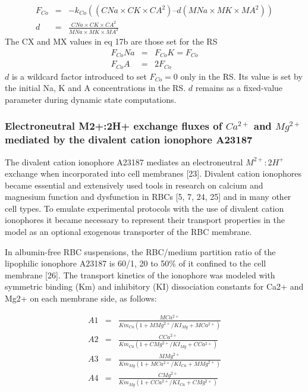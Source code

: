 \documentclass[a4paper]{article}
\newcommand{\med}[1]{M#1}
\newcommand{\cell}[1]{C#1}
\newcommand{\MA}{\med{A}}
\newcommand{\MNa}{\med{Na}}
\newcommand{\MK}{\med{K}}
\newcommand{\MCatp}{\med{Ca^{2+}}}
\newcommand{\MMgtp}{\med{Mg^{2+}}}
\newcommand{\Km}[1]{Km_{#1}}
\newcommand{\KI}[1]{KI_{#1}}
\newcommand{\CNa}{\cell{Na}}
\newcommand{\CK}{\cell{K}}
\newcommand{\CMgtp}{\cell{Mg^{2+}}}
\newcommand{\CCatp}{\cell{Ca^{2+}}}
\newcommand{\CA}{\cell{A}}
\newcommand{\F}[2]{F_{#1}#2}
\newcommand{\kk}[2]{k_{#1}#2}
\begin{document}
\begin{eqnarray}
\F{Co}{} &=& -\kk{Co}{}((CNa\times\CK\times\CA^2) – d(MNa\times\MK\times\MA^2)) \\
d &=& \frac{\CNa\times\CK\times\CA^2}{\MNa\times\MK\times\MA^2}
\end{eqnarray}
The CX and MX values in eq 17b are those set for the RS 
\begin{eqnarray}
\F{Co}{Na} &=& \F{Co}{K} = \F{Co}{}\\
\F{Co}{A} &=& 2\F{Co}{}
\end{eqnarray}
$d$ is a wildcard factor introduced to set $\F{Co}{} = 0$ only in the RS. Its value is set by the initial Na, K and A concentrations in the RS. $d$ remains as a fixed-value parameter during dynamic state computations.    

\subsubsection{Electroneutral M2+:2H+ exchange fluxes of $Ca^{2+}$ and $Mg^{2+}$ mediated by the divalent cation ionophore A23187}

The divalent cation ionophore A23187 mediates an electroneutral $M^{2+}:2H^+$ exchange when incorporated into cell membranes [23]. Divalent cation ionophores became essential and extensively used tools in research on calcium and magnesium function and dysfunction in RBCs [5, 7, 24, 25] and in many other cell types. To emulate experimental protocols with the use of divalent cation ionophores it became necessary to represent their transport properties in the model as an optional exogenous transporter of the RBC membrane.  

In albumin-free RBC suspensions, the RBC/medium partition ratio of the lipophilic ionophore A23187 is 60/1, 20 to 50\% of it confined to the cell membrane [26].  The transport kinetics of the ionophore was modeled with symmetric binding (Km) and inhibitory (KI) dissociation constants for Ca2+ and Mg2+ on each membrane side, as follows:


\begin{eqnarray}
\nonumber A1 &=& \frac{\MCatp}{\Km{Ca}(1 + \MMgtp/\KI{Mg} + \MCatp)} \\
\nonumber A2 &=& \frac{\CCatp}{\Km{Ca}(1 + \CMgtp/\KI{Mg} + \CCatp)}  \\
\nonumber A3 &=& \frac{\MMgtp}{\Km{Mg}(1 + \MCatp/\KI{Ca} + \MMgtp)}  \\
\nonumber A4 &=& \frac{\CMgtp}{\Km{Mg}(1 + \CCatp/\KI{Ca} + \CMgtp)} 
\end{eqnarray}
\end{document}
